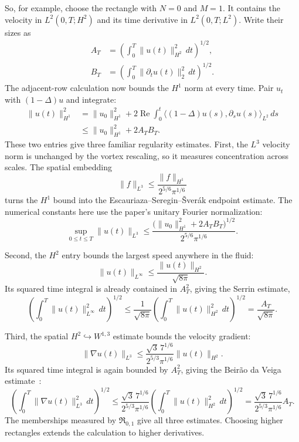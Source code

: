 So, for example, choose the rectangle with \(N=0\) and \(M=1\).
It contains the velocity in \(L^2(0,T;H^2)\) and its time derivative in
\(L^2(0,T;L^2)\). Write their sizes as
\[
 \begin{aligned}
 A_T&=\left(\int_0^T\|u(t)\|_{H^2}^2\,dt\right)^{1/2},\\
 B_T&=\left(\int_0^T\|\partial_tu(t)\|_2^2\,dt\right)^{1/2}.
 \end{aligned}
\]
The adjacent-row calculation now bounds the \(H^1\) norm at every
time. Pair \(u_t\) with \((1-\Delta)u\) and integrate:
\[
 \begin{aligned}
 \|u(t)\|_{H^1}^2
 &=\|u_0\|_{H^1}^2
   +2\operatorname{Re}\int_0^t
       \langle(1-\Delta)u(s),\partial_su(s)\rangle_{L^2}\,ds\\
 &\le\|u_0\|_{H^1}^2+2A_TB_T.
 \end{aligned}
\]
These two entries give three familiar regularity estimates. First, the
\(L^3\) velocity norm is unchanged by the vortex rescaling, so it
measures concentration across scales. The spatial embedding
\[
 \|f\|_{L^3}\le\frac{\|f\|_{H^1}}{2^{5/6}\pi^{1/6}}
\]
turns the \(H^1\) bound into the Escauriaza--Seregin--\v{S}ver\'ak
endpoint estimate. The numerical constants here use the paper's unitary
Fourier normalization:
\[
 \sup_{0\le t\le T}\|u(t)\|_{L^3}
 \le \frac{\bigl(\|u_0\|_{H^1}^2+2A_TB_T\bigr)^{1/2}}
              {2^{5/6}\pi^{1/6}}.
\]

Second, the \(H^2\) entry bounds the largest speed anywhere in the fluid:
\[
 \|u(t)\|_{L^\infty}\le\frac{\|u(t)\|_{H^2}}{\sqrt{8\pi}}.
\]
Its squared time integral is already contained in \(A_T^2\), giving
the Serrin estimate,
\[
 \left(\int_0^T\|u(t)\|_{L^\infty}^2\,dt\right)^{1/2}
 \le\frac1{\sqrt{8\pi}}
       \left(\int_0^T\|u(t)\|_{H^2}^2\,dt\right)^{1/2}
 =\frac{A_T}{\sqrt{8\pi}}.
\]

Third, the spatial \(H^2\hookrightarrow W^{1,3}\) estimate bounds
the velocity gradient:
\[
 \|\nabla u(t)\|_{L^3}
 \le\frac{\sqrt3\,7^{1/6}}{2^{5/3}\pi^{1/6}}\|u(t)\|_{H^2}.
\]
Its squared time integral is again bounded by \(A_T^2\), giving the
Beir\~ao da Veiga estimate~\cite{BeiraoDaVeiga1995}:
\[
 \left(\int_0^T\|\nabla u(t)\|_{L^3}^2\,dt\right)^{1/2}
 \le\frac{\sqrt3\,7^{1/6}}{2^{5/3}\pi^{1/6}}
       \left(\int_0^T\|u(t)\|_{H^2}^2\,dt\right)^{1/2}
 =\frac{\sqrt3\,7^{1/6}}{2^{5/3}\pi^{1/6}}A_T.
\]
\label{u:guide:how-proof-ends}
The memberships measured by \(\mathfrak R_{0,1}\) give all three estimates.
Choosing higher rectangles extends the calculation to higher derivatives.

